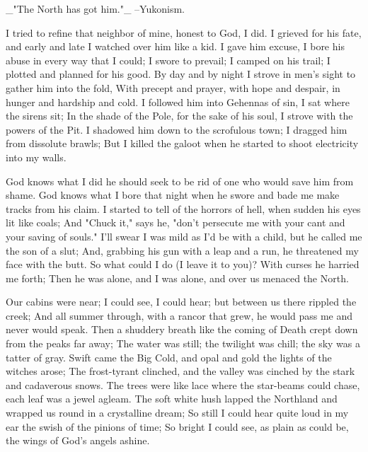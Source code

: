 
\begin{poemblock}
  _"The North has got him."_ --Yukonism.


 I tried to refine that neighbor of mine, honest to God, I did.
 I grieved for his fate, and early and late I watched over him like a kid.
 I gave him excuse, I bore his abuse in every way that I could;
 I swore to prevail; I camped on his trail;
   I plotted and planned for his good.
 By day and by night I strove in men's sight to gather him into the fold,
 With precept and prayer, with hope and despair,
   in hunger and hardship and cold.
 I followed him into Gehennas of sin, I sat where the sirens sit;
 In the shade of the Pole, for the sake of his soul,
   I strove with the powers of the Pit.
 I shadowed him down to the scrofulous town;
   I dragged him from dissolute brawls;
 But I killed the galoot when he started to shoot electricity into my walls.

 God knows what I did he should seek to be rid
   of one who would save him from shame.
 God knows what I bore that night when he swore
   and bade me make tracks from his claim.
 I started to tell of the horrors of hell,
   when sudden his eyes lit like coals;
 And "Chuck it," says he, "don't persecute me
   with your cant and your saving of souls."
 I'll swear I was mild as I'd be with a child,
   but he called me the son of a slut;
 And, grabbing his gun with a leap and a run,
   he threatened my face with the butt.
 So what could I do (I leave it to you)?  With curses he harried me forth;
 Then he was alone, and I was alone, and over us menaced the North.

 Our cabins were near; I could see, I could hear;
   but between us there rippled the creek;
 And all summer through, with a rancor that grew,
   he would pass me and never would speak.
 Then a shuddery breath like the coming of Death
   crept down from the peaks far away;
 The water was still; the twilight was chill; the sky was a tatter of gray.
 Swift came the Big Cold, and opal and gold the lights of the witches arose;
 The frost-tyrant clinched, and the valley was cinched
   by the stark and cadaverous snows.
 The trees were like lace where the star-beams could chase,
   each leaf was a jewel agleam.
 The soft white hush lapped the Northland and wrapped
   us round in a crystalline dream;
 So still I could hear quite loud in my ear
   the swish of the pinions of time;
 So bright I could see, as plain as could be,
   the wings of God's angels ashine.


\end{poemblock}
